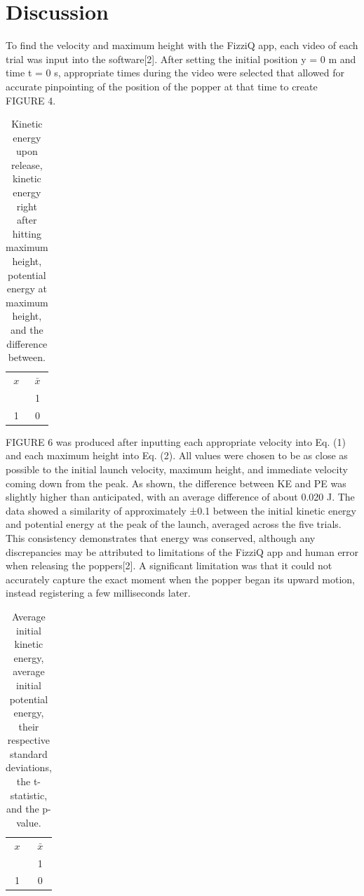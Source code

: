 \documentclass[amsmath,amssymb,aps,endfloats,linenumbers]{revtex4-2}
\begin{document}
    
\section{Discussion}

To find the velocity and maximum height with the FizziQ app, each video of each trial was input into the software[2]. After setting the initial position y = 0 m and time t = 0 s, appropriate times during the video were selected that allowed for accurate pinpointing of the position of the popper at that time to create FIGURE 4.

\begin{table}
\begin{center}
\begin{ruledtabular}
\begin{tabular}{cc}
$x$ & $\bar{x}$ \\
\colrule
0 & 1 \\ 
1 & 0 \\
\end{tabular}
\end{ruledtabular}
\end{center}
\caption{Kinetic energy upon release, kinetic energy right after hitting maximum height, potential energy at maximum height, and the difference between.}
\label{tab:bar}
\end{table}
    
FIGURE 6 was produced after inputting each appropriate velocity into Eq. (1) and each maximum height into Eq. (2). All values were chosen to be as close as possible to the initial launch velocity, maximum height, and immediate velocity coming down from the peak. As shown, the difference between KE and PE was slightly higher than anticipated, with an average difference of about 0.020 J. The data showed a similarity of approximately ±0.1 between the initial kinetic energy and potential energy at the peak of the launch, averaged across the five trials. This consistency demonstrates that energy was conserved, although any discrepancies may be attributed to limitations of the FizziQ app and human error when releasing the poppers[2]. A significant limitation was that it could not accurately capture the exact moment when the popper began its upward motion, instead registering a few milliseconds later.

\begin{table}
\begin{center}
\begin{ruledtabular}
\begin{tabular}{cc}
$x$ & $\bar{x}$ \\
\colrule
0 & 1 \\ 
1 & 0 \\
\end{tabular}
\end{ruledtabular}
\end{center}
\caption{Average initial kinetic energy, average initial potential energy, their respective standard deviations, the t-statistic, and the p-value.}
\label{tab:bar}
\end{table}
\end{document}
